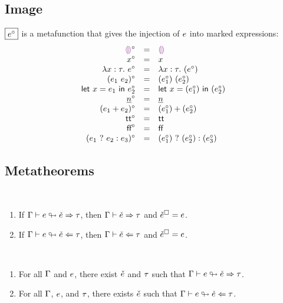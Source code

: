 \documentclass{article}
\begin{document}
\subsection{Image}
$\judgbox{\image{\EMV}}$ is a metafunction that gives the injection of $e$ into marked
expressions:
%
\newcommand{\imageIsRow}[2]{\image{#1} & = & #2}
\[\begin{array}{rcl}
  \imageIsRow{\EEHole}{\ECEHole} \\
  \imageIsRow{x}{x} \\
  \imageIsRow{\ELam{x}{\TMV}{\EMV}}{\ECLam{x}{\TMV}{(\image{\EMV})}} \\
  \imageIsRow{(\EAp{\EMV_1}{\EMV_2})}{\ECAp{(\image{\EMV_1})}{(\image{\EMV_2})}} \\
  \imageIsRow{\ELet{x}{\EMV_1}{\EMV_2}}{\ECLet{x}{(\image{\EMV_1})}{(\image{\EMV_2})}} \\
  \imageIsRow{\ENumMV}{\ECNumMV} \\
  \imageIsRow{(\EPlus{\EMV_1}{\EMV_2})}{\ECPlus{(\image{\EMV_1})}{(\image{\EMV_2})}} \\
  \imageIsRow{\ETrue}{\ECTrue} \\
  \imageIsRow{\EFalse}{\ECFalse} \\
  \imageIsRow{(\EIf{\EMV_1}{\EMV_2}{\EMV_3})}{\ECIf{(\image{\EMV_1})}{(\image{\EMV_2})}{(\image{\EMV_3})}} \\
\end{array}\]

\subsection{Metatheorems}
\begin{theorem}[name=Mark Insertion] \
  \begin{enumerate}
    \item If $\Gamma \vdash e \looparrowright \check{e} \Rightarrow \tau$, then $\Gamma \vdash \check{e} \Rightarrow \tau$ and
      $\check{e}^{\square} = e$.
    \item If $\Gamma \vdash e \looparrowright \check{e} \Leftarrow \tau$, then $\Gamma \vdash \check{e} \Leftarrow \tau$ and
      $\check{e}^{\square} = e$.
  \end{enumerate}
\end{theorem}

\begin{theorem}[name=Totality] \
  \begin{enumerate}
    \item For all $\Gamma$ and $e$, there exist $\check{e}$ and $\tau$ such that
      $\Gamma \vdash e \looparrowright \check{e} \Rightarrow \tau$.
    \item For all $\Gamma$, $e$, and $\tau$, there exists $\check{e}$ such that
      $\Gamma \vdash e \looparrowright \check{e} \Leftarrow \tau$.
  \end{enumerate}
\end{theorem}
\end{document}
